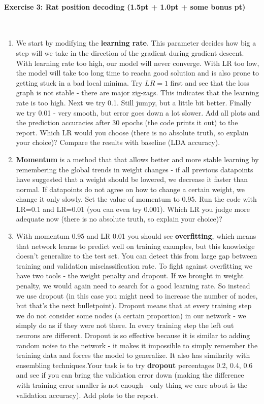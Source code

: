 \documentclass[a4paper,11pt]{article}
\newenvironment{exercise}[3]{\paragraph{Exercise #1: #2 (#3pt)}\ \\}{
\medskip}
\begin{document}
\begin{exercise}{3}{Rat position decoding}{1.5pt + 1.0pt + some bonus }
\begin{enumerate}
  \item We start by modifying the \textbf{learning rate}. This parameter decides how big a step will we take in the direction of the gradient during gradient descent. With learning rate too high, our model will never converge. With LR too low, the model will take too long time to reacha  good solution and is also prone to getting stuck in a bad local minima. Try $LR=1$ first and see that the loss graph is not stable - there are major zig-zags. This indicates that the learning rate is too high. Next we try 0.1. Still jumpy, but a little bit better. Finally we try 0.01 - very smooth, but error goes down a lot slower. Add all plots and the prediction accuracies after 30 epochs (the code prints it out) to the report. Which LR would you choose (there is no absolute truth, so explain your choice)? Compare the results with baseline (LDA accuracy).
  \item \textbf{Momentum} is a method that that allows better and more stable learning by remembering the global trends in weight changes - if all previous datapoints have suggested that a weight should be lowered, we decrease it faster than normal. If datapoints do not agree on how to change a certain weight, we change it only slowly. \newline Set the value of momentum to 0.95. Run the code with LR=0.1 and LR=0.01 (you can even try 0.001). Which LR you judge more adequate now (there is no absolute truth, so explain your choice)?
  \item With momentum 0.95 and LR 0.01 you should see \textbf{overfitting}, which means that network learns to predict well on training examples, but this knowledge doesn't generalize to the test set. You can detect this from large gap between training and validation misclassification rate. To fight against overfitting we have two tools - the weight penalty and dropout. 
If we brought in weight penalty, we would again need to search for a good learning rate. So instead we use dropout (in this case you might need to increase the number of nodes, but that's the next bulletpoint). Dropout means that at every training step we do not consider some nodes (a certain proportion) in our network - we simply do as if they were not there. In every training step the left out neurons are different. Dropout is so effective because it is similar to adding random noise to the network - it makes it impossible to simply remember the training data and forces the model to generalize. It also has similarity with ensembling techniques.\newline Your task is to try \textbf{dropout} percentages 0.2, 0.4, 0.6 and see if you can bring the validation error down (making the difference with training error smaller is not enough - only thing we care about is the validation accuracy). Add plots to the report.

\end{enumerate}
\end{exercise}
\end{document}

